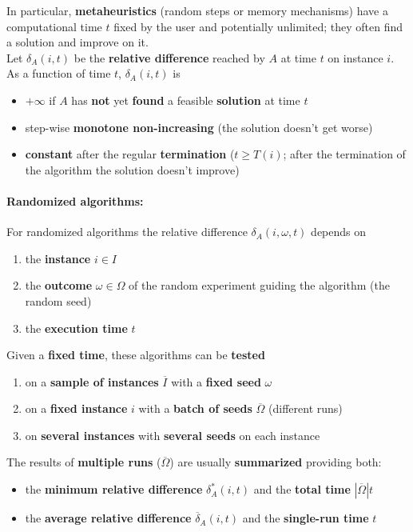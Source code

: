 In particular, \textbf{metaheuristics} (random steps or memory mechanisms) have a computational time $t$ fixed by the user and potentially unlimited; they often find a solution and improve on it.\\

Let $\delta_A (i, t)$ be the \textbf{relative difference} reached by $A$ at time $t$ on instance $i$.\\
As a function of time $t$, $\delta_A (i, t)$ is
\begin{itemize}
	\item $+ \infty$ if $A$ has \textbf{not} yet \textbf{found} a feasible \textbf{solution} at time $t$
	\item step-wise \textbf{monotone non-increasing} (the solution doesn't get worse)
	\item \textbf{constant} after the regular \textbf{termination} ($t \geq T (i)$; after the termination of the algorithm the solution doesn't improve)
\end{itemize}

\vfill

\paragraph{Randomized algorithms:} For randomized algorithms the relative difference $\delta_A (i, \omega, t)$ depends on
\begin{enumerate}
	\item the \textbf{instance} $i \in I$
	\item the \textbf{outcome} $\omega \in \Omega$ of the random experiment guiding the algorithm (the random seed)
	\item the \textbf{execution time} $t$
\end{enumerate}

Given a \textbf{fixed time}, these algorithms can be \textbf{tested}
\begin{enumerate}
	\item on a \textbf{sample of instances} $\overline{I}$ with a \textbf{fixed seed} $\omega$
	\item on a \textbf{fixed instance} $i$ with a \textbf{batch of seeds} $\overline{\Omega}$ (different runs)
	\item on \textbf{several instances} with \textbf{several seeds} on each instance
\end{enumerate}

The results of \textbf{multiple runs} ($\overline{\Omega}$) are usually \textbf{summarized} providing both:
\begin{itemize}
	\item the \textbf{minimum relative difference} $\delta_A^\ast (i, t)$ and the \textbf{total time} $|\overline{\Omega}|t$
	\item the \textbf{average relative difference} $\overline{\delta}_A (i, t)$ and the \textbf{single-run time} $t$
\end{itemize}

